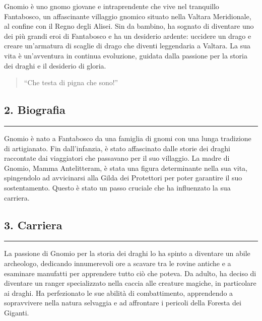 Gnomio è uno gnomo giovane e intraprendente che vive nel tranquillo
Fantabosco, un affascinante villaggio gnomico situato nella Valtara
Meridionale, al confine con il Regno degli Alisei. Sin da bambino, ha
sognato di diventare uno dei più grandi eroi di Fantabosco e ha un
desiderio ardente: uccidere un drago e creare un'armatura di scaglie di
drago che diventi leggendaria a Valtara. La sua vita è un'avventura in
continua evoluzione, guidata dalla passione per la storia dei draghi e
il desiderio di gloria.

\begin{quote}
``Che testa di pigna che sono!''
\end{quote}

\subsection{2. Biografia}\label{biografia}

\begin{center}\rule{0.5\linewidth}{0.5pt}\end{center}

Gnomio è nato a Fantabosco da una famiglia di gnomi con una lunga
tradizione di artigianato. Fin dall'infanzia, è stato affascinato dalle
storie dei draghi raccontate dai viaggiatori che passavano per il suo
villaggio. La madre di Gnomio, Mamma Antelitteram, è stata una figura
determinante nella sua vita, spingendolo ad avvicinarsi alla Gilda dei
Protettori per poter garantire il suo sostentamento. Questo è stato un
passo cruciale che ha influenzato la sua carriera.

\subsection{3. Carriera}\label{carriera}

\begin{center}\rule{0.5\linewidth}{0.5pt}\end{center}

La passione di Gnomio per la storia dei draghi lo ha spinto a diventare
un abile archeologo, dedicando innumerevoli ore a scavare tra le rovine
antiche e a esaminare manufatti per apprendere tutto ciò che poteva. Da
adulto, ha deciso di diventare un ranger specializzato nella caccia alle
creature magiche, in particolare ai draghi. Ha perfezionato le sue
abilità di combattimento, apprendendo a sopravvivere nella natura
selvaggia e ad affrontare i pericoli della Foresta dei Giganti.

